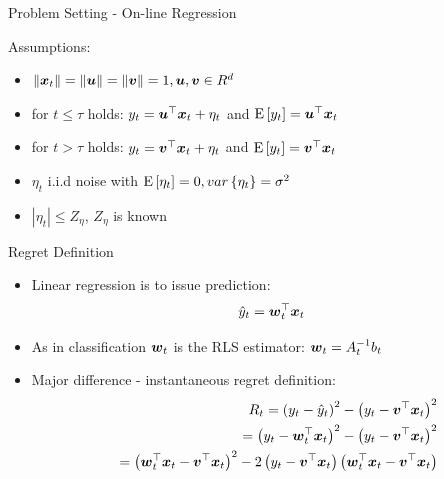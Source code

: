 \documentclass{beamer}
\begin{document}
\begin{frame}{Problem Setting - On-line Regression}

Assumptions:\newline
\begin{itemize}
\item $\|{\boldsymbol{x}}_{t}\|=\|{\boldsymbol{u}}\|=\|{\boldsymbol{v}}\|=1, {\boldsymbol{u}}, {\boldsymbol{v}}\in R^d$\newline
\item for $t\leq\tau$ holds:\newline\newline
 $y_t={{\boldsymbol{u}}}^{\top}{\boldsymbol{x}}_{t}+\eta_t$ and ${\rm E}\left[{y_t}\right]={{\boldsymbol{u}}}^{\top}{\boldsymbol{x}}_{t}$\newline

\item for $t>\tau$ holds:\newline\newline
 $y_t={{\boldsymbol{v}}}^{\top}{\boldsymbol{x}}_{t}+\eta_t$ and ${\rm E}\left[{y_t}\right]={{\boldsymbol{v}}}^{\top}{\boldsymbol{x}}_{t}$\newline
\item $\eta_t$ i.i.d noise with ${\rm E}\left[{\eta_t}\right]=0, var\left\{\eta_t\right\}=\sigma^2$ \newline
\item $\left\vert\eta_t\right\vert\leq Z_{\eta}$, $Z_{\eta}$ is known
\end{itemize}


\end{frame}

\begin{frame}{Regret Definition}
\begin{itemize}
\item Linear regression is to issue prediction:\newline
\begin{equation}
\hat{y}_t={{\boldsymbol{w}}}^{\top}_{t}{\boldsymbol{x}}_{t}
\end{equation}
\item As in classification ${\boldsymbol{w}}_{t}$ is the RLS estimator: ${\boldsymbol{w}}_{t}=A_{t}^{-1}b_t$\newline
\item Major difference - instantaneous regret definition:
\begin{eqnarray*}
&&R_t=\left(y_t-\hat{y}_t\right)^2-\left(y_t-{{\boldsymbol{v}}}^{\top}{\boldsymbol{x}}_{t}\right)^2\\
&&=\left(y_t-{{\boldsymbol{w}}}^{\top}_{t}{\boldsymbol{x}}_{t}\right)^2-\left(y_t-{{\boldsymbol{v}}}^{\top}{\boldsymbol{x}}_{t}\right)^2\\
&&=\left({{\boldsymbol{w}}}^{\top}_{t}{\boldsymbol{x}}_{t}-{{\boldsymbol{v}}}^{\top}{\boldsymbol{x}}_{t}\right)^2-2\left(y_t-{{\boldsymbol{v}}}^{\top}{\boldsymbol{x}}_{t}\right)\left({{\boldsymbol{w}}}^{\top}_{t}{\boldsymbol{x}}_{t}-{{\boldsymbol{v}}}^{\top}{\boldsymbol{x}}_{t}\right)
\end{eqnarray*}
\end{itemize}
\end{frame}
\end{document}
